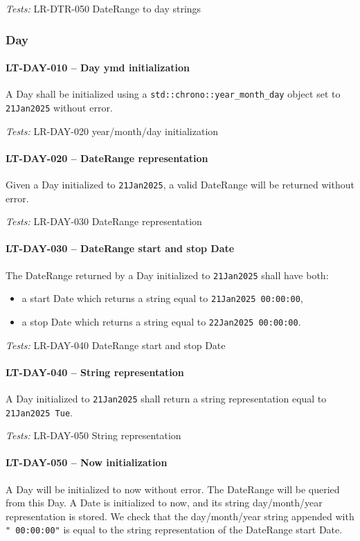 \textit{Tests: } LR-DTR-050 DateRange to day strings

\subsubsection{Day}
\paragraph{LT-DAY-010 -- Day ymd initialization}
A Day shall be initialized using a \lstinline{std::chrono::year_month_day}
object set to \lstinline{21Jan2025} without error.

\textit{Tests: } LR-DAY-020 year/month/day initialization

\paragraph{LT-DAY-020 -- DateRange representation}
Given a Day initialized to \lstinline{21Jan2025}, a valid DateRange
will be returned without error.

\textit{Tests: } LR-DAY-030 DateRange representation

\paragraph{LT-DAY-030 -- DateRange start and stop Date}
The DateRange returned by a Day initialized to \lstinline{21Jan2025}
shall have both:
\begin{itemize}
\item a start Date which returns a string equal to
  \lstinline{21Jan2025 00:00:00},
\item a stop Date which returns a string equal to
  \lstinline{22Jan2025 00:00:00}.
\end{itemize}

\textit{Tests: } LR-DAY-040 DateRange start and stop Date

\paragraph{LT-DAY-040 -- String representation}
A Day initialized to \lstinline{21Jan2025} shall return a string
representation equal to \lstinline{21Jan2025 Tue}.

\textit{Tests: } LR-DAY-050 String representation

\paragraph{LT-DAY-050 -- Now initialization}
A Day will be initialized to now without error. The DateRange will be queried
from this Day.
A Date is initialized to now, and its string day/month/year representation
is stored.
We check that the day/month/year string appended with \lstinline{" 00:00:00"} is
equal to the string representation of the DateRange start Date.

